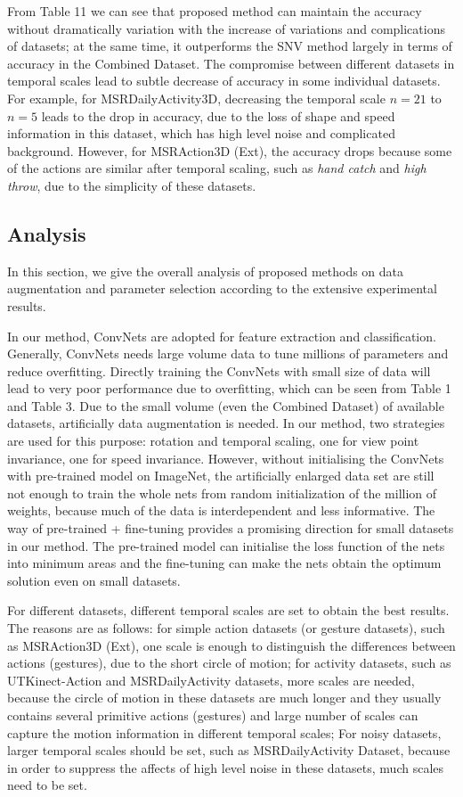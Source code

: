 \documentclass[conference]{IEEEtran}
\begin{document}
From Table 11 we can see that proposed method can maintain the accuracy without dramatically variation with the increase of variations and complications of datasets; at the same time, it outperforms the SNV method largely in terms of accuracy in the Combined Dataset. The compromise between different datasets in temporal scales lead to subtle decrease of accuracy in some individual datasets. For example, for MSRDailyActivity3D, decreasing the temporal scale $n = 21$ to $n = 5$ leads to the drop in accuracy, due to the loss of shape and speed information in this dataset, which has high level noise and complicated background. However, for MSRAction3D (Ext), the accuracy drops because some of the actions are similar after temporal scaling, such as \textit{hand catch} and \textit{high throw}, due to the simplicity of these datasets.

\subsection{Analysis}
In this section, we give the overall analysis of proposed methods on data augmentation and parameter selection according to the extensive experimental results. 

In our method, ConvNets are adopted for feature extraction and classification. Generally, ConvNets needs large volume data to tune millions of parameters and reduce overfitting. Directly training the ConvNets with small size of data will lead to very poor performance due to overfitting, which can be seen from Table 1 and Table 3. Due to the small volume (even the Combined Dataset) of available datasets, artificially data augmentation is needed. In our method, two strategies are used for this purpose: rotation and temporal scaling, one for view point invariance, one for speed invariance. However, without initialising the ConvNets with pre-trained model on ImageNet, the artificially enlarged data set are still not enough to train the whole nets from random initialization of the million of weights, because much of the data is interdependent and less informative. The way of pre-trained + fine-tuning provides a promising direction for small datasets in our method. The pre-trained model can initialise the loss function of the nets into minimum areas and the fine-tuning can make the nets obtain the optimum solution even on small datasets.  

For different datasets, different temporal scales are set to obtain the best results. The reasons are as follows: for simple action datasets (or gesture datasets), such as MSRAction3D (Ext), one scale is enough to distinguish the differences between actions (gestures), due to the short circle of motion; for activity datasets, such as UTKinect-Action and MSRDailyActivity datasets, more scales are needed, because the circle of motion in these datasets are much longer and they usually contains several primitive actions (gestures) and large number of scales can capture the motion information in different temporal scales; For noisy datasets, larger temporal scales should be set, such as MSRDailyActivity Dataset, because in order to suppress the affects of high level noise in these datasets, much scales need to be set. 
\end{document}
